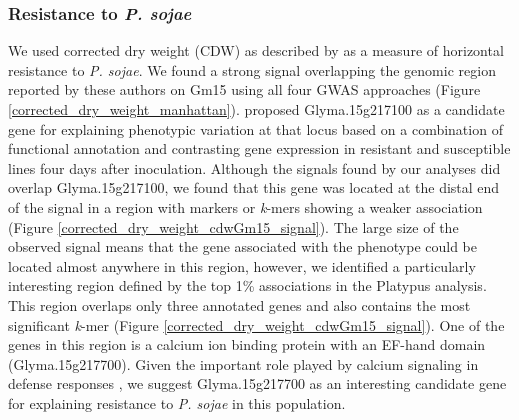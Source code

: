 \begin{figure}
\end{figure}

\subsubsection*{Resistance to \textit{P. sojae}}
\label{sv-gwas-main-results-psojae}

We used corrected dry weight (CDW) as described by \cite{deronne2022} as a
measure of horizontal resistance to \emph{P. sojae}. We found a strong signal
overlapping the genomic region reported by these authors on Gm15 using all four GWAS
approaches (Figure \ref{corrected_dry_weight_manhattan}). \cite{deronne2022}
proposed Glyma.15g217100 as a candidate gene for explaining phenotypic
variation at that locus based on a combination of functional annotation and
contrasting gene expression in resistant and susceptible lines four days after
inoculation. Although the signals found by our analyses did overlap
Glyma.15g217100, we found that this gene was located at the distal end of the signal
in a region with markers or \emph{k}-mers showing a weaker
association (Figure \ref{corrected_dry_weight_cdwGm15_signal}). The
large size of the observed signal means that the gene associated with the phenotype could
be located almost anywhere in this region, however, we identified a particularly
interesting region defined by the top 1\% associations in the Platypus
analysis. This region overlaps only three annotated genes and also contains the
most significant \emph{k}-mer (Figure
\ref{corrected_dry_weight_cdwGm15_signal}). One of the genes in this region is
a calcium ion binding protein with an EF-hand domain (Glyma.15g217700).
Given the important role played by calcium signaling in defense
responses \citep{zhang2014}, we suggest Glyma.15g217700 as an interesting
candidate gene for explaining resistance to \emph{P. sojae} in this population.


